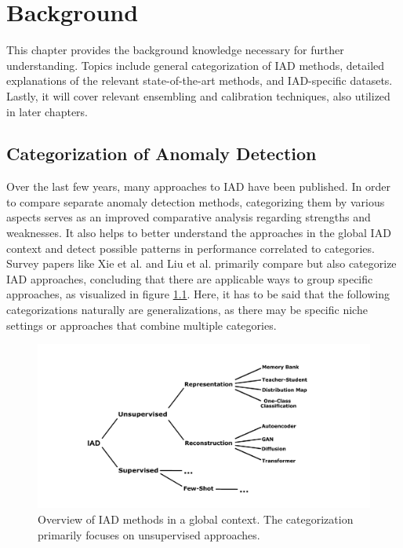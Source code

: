 \chapter{Background}
\label{chap:background}

This chapter provides the background knowledge necessary for further understanding. Topics include general categorization of IAD methods, detailed explanations of the relevant 
state-of-the-art methods, and IAD-specific datasets. Lastly, it will cover relevant ensembling and calibration techniques, also utilized in later chapters.



\section{Categorization of Anomaly Detection}
\label{sec:IADcategs}
Over the last few years, many approaches to IAD have been published. In order to compare separate anomaly detection methods, categorizing them by various 
aspects serves as an improved comparative analysis regarding strengths and weaknesses. It also helps to better understand the approaches in the global IAD context and
detect possible patterns in performance correlated to categories. Survey papers like Xie et al. \cite{Xie_2024benchmarking} and 
Liu et al.
\cite{liu2024deep} primarily compare but also categorize IAD approaches, concluding that there are applicable ways to group specific approaches, as 
visualized in figure \ref{fig:IADcategstree}. Here, it has to be said that the following categorizations naturally are generalizations, as there may be specific niche settings or approaches that combine multiple categories.


\begin{figure}[H]
\centering
\includegraphics[width=\textwidth]{figures/Wald.pdf}
\caption{Overview of IAD methods in a global context. The categorization primarily focuses on unsupervised approaches.}
\label{fig:IADcategstree}
\end{figure}

